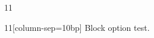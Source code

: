 \documentclass[paper=A4]{ropas-poster}
\begin{document}
\begin{postergrid}{1}{1}
\begin{posterblock}{1}{1}[column-sep=10bp]
Block option test.
\end{posterblock}
\end{postergrid}
\end{document}
